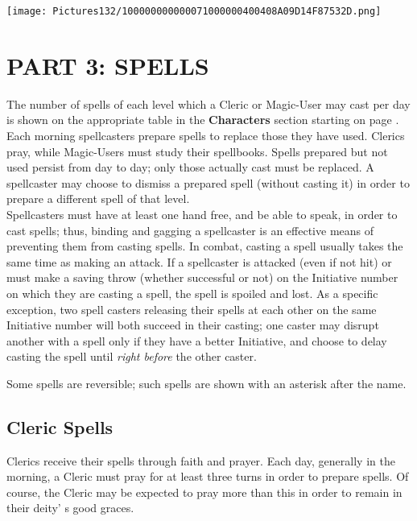 \documentclass[a4paper,twoside,openany,10pt]{book}
\begin{document}
\vfill

\texttt{[image: Pictures132/100000000000071000000400408A09D14F87532D.png]}

\pagebreak

\section{PART 3: SPELLS}\label{part-3-spells}

\begin{multicols}{2}
	
The number of spells of each level which a Cleric or Magic-User may cast
per day is shown on the appropriate table in the \textbf{Characters} section starting on page \hyperlink{part-2-player-characters}{\pageref{part-2-player-characters}}. Each morning spellcasters prepare spells to replace those they have used. Clerics pray, while Magic-Users must study their spellbooks. Spells prepared but not used persist from day to day; only those actually cast must be replaced. A spellcaster may choose to dismiss a prepared spell (without casting it) in order to prepare a different spell of that level.\\

Spellcasters must have at least one hand free, and be able to speak, in order to cast spells; thus, binding and gagging a spellcaster is an effective means of preventing them from casting spells. In combat, casting a spell usually takes the same time as making an attack. If a spellcaster is attacked (even if not hit) or must make a saving throw (whether successful or not) on the Initiative number on which they are casting a spell, the spell is spoiled and lost. As a specific exception, two spell casters releasing their spells at each other on the same Initiative number will both succeed in their casting; one caster may disrupt another with a spell only if they have a better Initiative, and choose to delay casting the spell until \emph{right before} the other caster.

Some spells are reversible; such spells are shown with an asterisk after the name.

\subsection{Cleric Spells}\label{cleric-spells}

Clerics receive their spells through faith and prayer. Each day, generally in the morning, a Cleric must pray for at least three turns in order to prepare spells. Of course, the Cleric may be expected to pray more than this in order to remain in their deity' s good graces.


\end{multicols}
\end{document}
